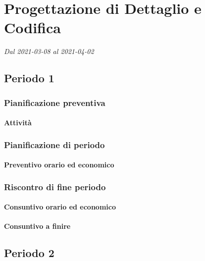 \section{Progettazione di Dettaglio e Codifica}
\textit{Dal 2021-03-08 al 2021-04-02}




\subsection{Periodo 1}

\subsubsection{Pianificazione preventiva}

\paragraph{Attività}


\subsubsection{Pianificazione di periodo}



\paragraph{Preventivo orario ed economico}



\subsubsection{Riscontro di fine periodo}


\paragraph{Consuntivo orario ed economico}


\paragraph{Consuntivo a finire}





\subsection{Periodo 2}

